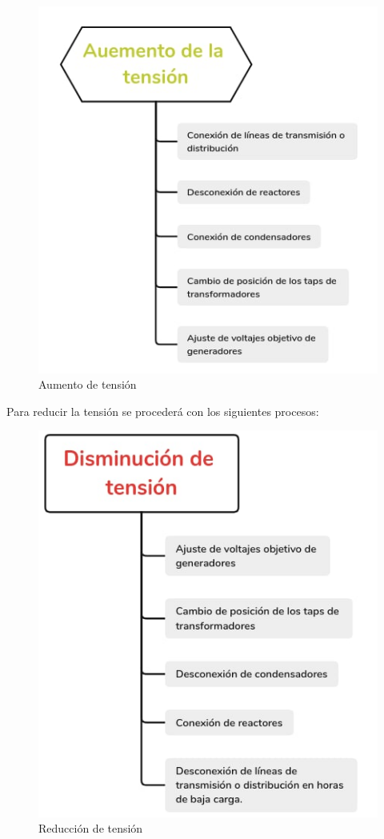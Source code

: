 \documentclass[a5paper]{book}%
\begin{document}
\begin{figure}[H]
  \centering
  \caption{Aumento de tensión}
  \label{fig:aumentotension}
  \includegraphics[width=0.8\linewidth]{aumentartension}
\end{figure}

Para reducir la tensión se procederá con los siguientes procesos:

\begin{figure}[H]
  \centering
  \caption{Reducción de  tensión}
  \label{fig:reducciontension}
  \includegraphics[width=0.8\linewidth]{reducirtension}
\end{figure}
\end{document}
